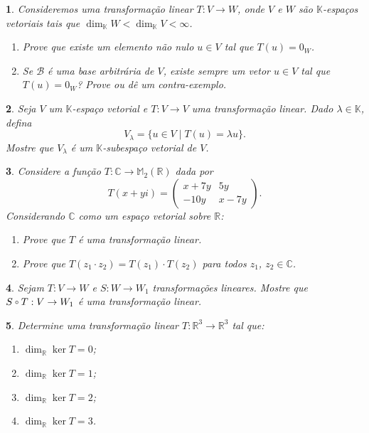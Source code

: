 \documentclass[12pt]{exam}
\newtheorem{exercicio}{}
\newcommand{\real}{\mathbb{R}}
\newcommand{\complex}{\mathbb{C}}
\newcommand{\cp}[1]{\mathbb{#1}}
\newcommand{\compcent}[1]{\vcenter{\hbox{$#1\circ$}}}
\newcommand{\comp}{\mathbin{\mathchoice
{\compcent\scriptstyle}{\compcent\scriptstyle}
{\compcent\scriptscriptstyle}{\compcent\scriptscriptstyle}}}
\begin{document}
\begin{exercicio}
  Consideremos uma transforma\c{c}\~ao linear $T : V \to W$, onde $V$ e $W$ s\~ao $\cp{K}$-espa\c{c}os vetoriais tais que $\dim_\cp{K}W < \dim_\cp{K}V < \infty$.
  \begin{enumerate}[label=({\alph*})]
    \item Prove que existe um elemento n\~ao nulo $u \in V$ tal que $T(u) = 0_W$.
    \item Se $\mathcal{B}$ \'e uma base arbitr\'aria de $V$, existe sempre um vetor $u \in V$ tal que $T(u) = 0_W$? Prove ou d\^e um contra-exemplo.
  \end{enumerate}
\end{exercicio}


\begin{exercicio}
  Seja $V$ um $\cp{K}$-espa\c{c}o vetorial e $T : V \to V$ uma transforma\c{c}\~ao linear. Dado $\lambda \in \cp{K}$, defina
  \[
    V_\lambda = \{ u \in V \mid T(u) = \lambda u\}.
  \]
  Mostre que $V_\lambda$ \'e um $\cp{K}$-subespa\c{c}o vetorial de $V$.
\end{exercicio}

\begin{exercicio}
  Considere a fun\c{c}\~ao $T : \complex \to \cp{M}_2(\real)$ dada por
  \[
    T(x + yi) = \begin{pmatrix}
      x + 7y & 5y\\
      -10y & x - 7y
    \end{pmatrix}.
  \]
  Considerando $\complex$ como um espa\c{c}o vetorial sobre $\real$:
  \begin{enumerate}[label=({\alph*})]
    \item Prove que $T$ \'e uma transforma\c{c}\~ao linear.
    \item Prove que $T(z_1\cdot z_2) = T(z_1)\cdot T(z_2)$ para todos $z_1$, $z_2 \in \complex$.
  \end{enumerate}
\end{exercicio}

\begin{exercicio}
  Sejam $T : V \to W$ e $S : W \to W_1$ transforma\c{c}\~oes lineares. Mostre que $S \comp T : V \to W_1$ \'e uma transforma\c{c}\~ao linear.
\end{exercicio}

\begin{exercicio}
  Determine uma transforma\c{c}\~ao linear $T : \real^3 \to \real^3$ tal que:
  \begin{enumerate}[label=({\alph*})]
    \item $\dim_\real \ker T = 0$;
    \item $\dim_\real \ker T = 1$;
    \item $\dim_\real \ker T = 2$;
    \item $\dim_\real \ker T = 3$.
  \end{enumerate}
\end{exercicio}
\end{document}
